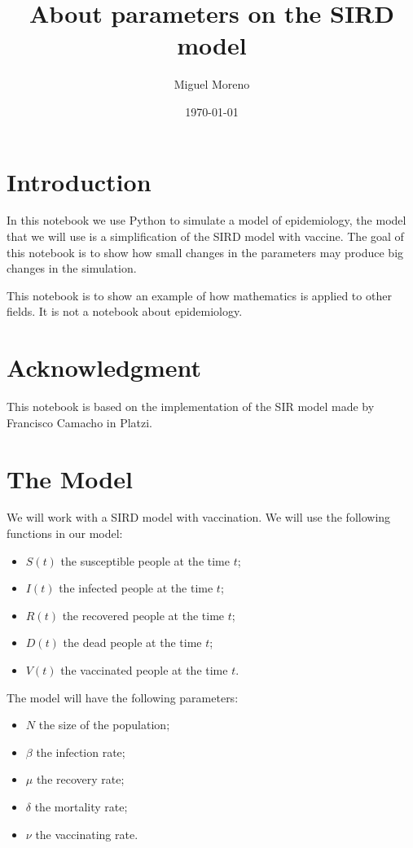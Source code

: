\documentclass[14pt]{amsart}
\title{About parameters on the SIRD model}
\author{Miguel Moreno}
\begin{document}
\date{\today}

\maketitle

\section{Introduction}\label{introduction}

In this notebook we use Python to simulate a model of epidemiology, the model that we will use is a simplification of the SIRD model with vaccine. The goal of this notebook is to show how small changes in the parameters may produce big changes in the simulation.

This notebook is to show an example of how mathematics is applied to other fields. It is not a notebook about epidemiology.

\section{Acknowledgment}\label{acknowledgment}

This notebook is based on the implementation of the SIR model made by Francisco Camacho in Platzi.


\section{The Model}\label{The Model}

We will work with a SIRD model with vaccination. We will use the following functions in our model:
\begin{itemize}
\item $S(t)$ the susceptible people at the time $t$;
\item $I(t)$ the infected people at the time $t$;
\item $R(t)$ the recovered people at the time $t$;
\item $D(t)$ the dead people at the time $t$;
\item $V(t)$ the vaccinated people at the time $t$.
\end{itemize}

The model will have the following parameters: 
\begin{itemize}
\item $N$ the size of the population;
\item $\beta$ the infection rate;
\item $\mu$ the recovery rate;
\item $\delta$ the mortality rate;
\item $\nu$ the vaccinating rate.
\end{itemize}
\end{document}
